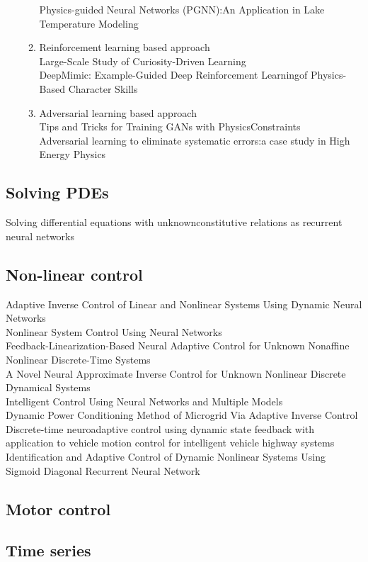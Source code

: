 \documentclass[conference]{IEEEtran}
\begin{document}
\begin{enumerate}
\begin{enumerate}
      Physics-guided Neural Networks (PGNN):An Application in Lake Temperature Modeling \cite{karpatne2017physics-guided} \\
    \item Reinforcement learning based approach \\
      Large-Scale Study of Curiosity-Driven Learning \cite{burda2018large-scale}\\
      DeepMimic: Example-Guided Deep Reinforcement Learningof Physics-Based Character Skills \cite{peng2018deepmimic} \\
    \item Adversarial learning based approach \\
      Tips and Tricks for Training GANs with PhysicsConstraints \\
      Adversarial learning to eliminate systematic errors:a case study in High Energy Physics \\
  \end{enumerate}

\end{enumerate}

\subsection{Solving PDEs}
Solving differential equations with unknownconstitutive relations as recurrent neural networks \\

\subsection{Non-linear control}
Adaptive Inverse Control of Linear and Nonlinear Systems Using Dynamic Neural Networks \cite{plett2003adaptive} \\
Nonlinear System Control Using Neural Networks \\
Feedback-Linearization-Based Neural Adaptive Control for Unknown Nonaffine Nonlinear Discrete-Time Systems \\
A Novel Neural Approximate Inverse Control for Unknown Nonlinear Discrete Dynamical Systems \cite{deng2005a} \\
Intelligent Control Using Neural Networks and Multiple Models \cite{fu2008intelligent} \\
Dynamic Power Conditioning Method of Microgrid Via Adaptive Inverse Control \cite{li2015dynamic} \\
Discrete-time neuroadaptive control using dynamic state feedback with application to vehicle motion control for intelligent vehicle highway systems \cite{kumarawadu2010discrete-time} \\
Identification and Adaptive Control of Dynamic Nonlinear Systems Using Sigmoid Diagonal Recurrent Neural Network \cite{aboueldahab2011identification} \\

\subsection{Motor control}
\subsection{Time series}




\end{document}
